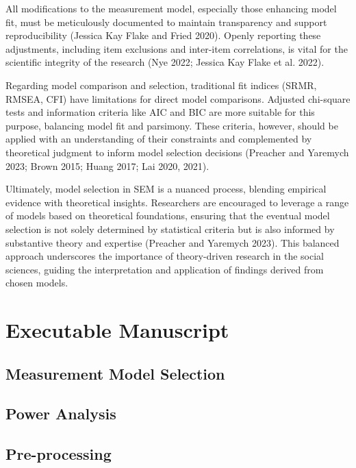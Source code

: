 \documentclass[
  a4paper,
]{article}
\begin{document}
All modifications to the measurement model, especially those enhancing
model fit, must be meticulously documented to maintain transparency and
support reproducibility (Jessica Kay Flake and Fried 2020). Openly
reporting these adjustments, including item exclusions and inter-item
correlations, is vital for the scientific integrity of the research (Nye
2022; Jessica Kay Flake et al. 2022).

Regarding model comparison and selection, traditional fit indices (SRMR,
RMSEA, CFI) have limitations for direct model comparisons. Adjusted
chi-square tests and information criteria like AIC and BIC are more
suitable for this purpose, balancing model fit and parsimony. These
criteria, however, should be applied with an understanding of their
constraints and complemented by theoretical judgment to inform model
selection decisions (Preacher and Yaremych 2023; Brown 2015; Huang 2017;
Lai 2020, 2021).

Ultimately, model selection in SEM is a nuanced process, blending
empirical evidence with theoretical insights. Researchers are encouraged
to leverage a range of models based on theoretical foundations, ensuring
that the eventual model selection is not solely determined by
statistical criteria but is also informed by substantive theory and
expertise (Preacher and Yaremych 2023). This balanced approach
underscores the importance of theory-driven research in the social
sciences, guiding the interpretation and application of findings derived
from chosen models.


\section{Executable Manuscript}\label{executable-manuscript}

\subsection{Measurement Model
Selection}\label{measurement-model-selection-1}

\subsection{Power Analysis}\label{power-analysis-1}

\subsection{Pre-processing}\label{pre-processing-1}
\end{document}
